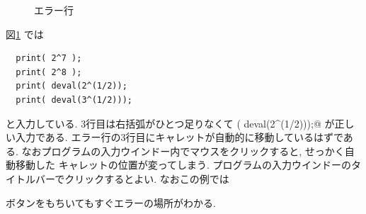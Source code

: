 \documentclass{jbook}
\begin{document}
\begin{figure}[htb]
\begin{center}
\end{center}
\caption{エラー行} \label{fig:errorMultiLine}
\end{figure}
図\ref{fig:errorMultiLine} では
\begin{screen}
\begin{verbatim}
  print( 2^7 );
  print( 2^8 );
  print( deval(2^(1/2));
  print( deval(3^(1/2)));
\end{verbatim}
\end{screen}
と入力している. 
3行目は右括弧がひとつ足りなくて
\verb@print( deval(2^(1/2)));@
が正しい入力である.
エラー行の3行目にキャレットが自動的に移動しているはずである.
なおプログラムの入力ウインドー内でマウスをクリックすると, せっかく自動移動した
キャレットの位置が変ってしまう. 
プログラムの入力ウインドーのタイトルバーでクリックするとよい.
なおこの例では 
\begin{center}
\end{center}
ボタンをもちいてもすぐエラーの場所がわかる.
\end{document}
